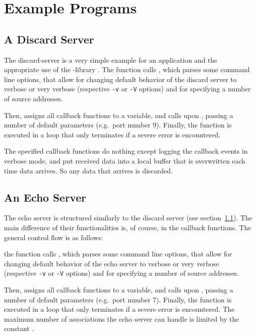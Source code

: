 \documentclass[10pt]{article}
\newcommand{\lib}{ \libname{libsctp}-library }
\begin{document}
\section{Example Programs}
\label{programs}
\subsection{A Discard Server}
\label{discard}
The discard-server is a very simple example for an
application and the appropriate use of the \lib.
The  function calls , which
parses some command line options,
that allow for changing default behavior of the discard server
to verbose or very verbose (respective \texttt{-v} or \texttt{-V}
options) and for specifying a number of source addresses.

Then,  assigns all callback functions to a
 variable, and calls upon
, passing a number of default parameters
(e.g.\ port number 9). Finally, the function  is
executed in a loop that only terminates if a severe error is encountered.

The specified callback functions do nothing except logging the callback
events in verbose mode, and put received data into a local buffer that is
overwritten each time data arrives. So any data that arrives is discarded.

\subsection{An Echo Server}
\label{echo1}
The echo server is structured similarly to the discard server (see section~\ref{discard}).
The main difference of their functionalities is, of course, in
the callback functions. The general control flow is as follows:

the  function calls , which
parses some command line options,
that allow for changing default behavior of the echo server
to verbose or very verbose (respective \texttt{-v} or \texttt{-V}
options) and for specifying a number of source addresses.

Then,  assigns all callback functions to a
 variable, and calls upon
, passing a number of default parameters
(e.g.\ port number 7). Finally, the function  is
executed in a loop that only terminates if a severe error is encountered.
The maximum number of associations the echo server can handle is
limited by the constant .
\end{document}
